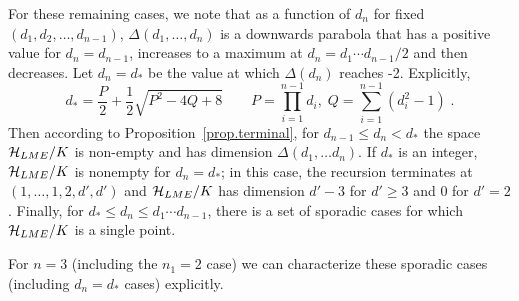 \documentclass[12pt]{article}
\theoremstyle{definition}
\begin{document}
For these remaining cases, we note that as a function of $d_n$ for fixed $(d_1,d_2,\dots,d_{n-1})$,  $\Delta(d_1,\dots,d_n)$ is a downwards parabola that has a positive value for $d_n = d_{n-1}$, increases to a maximum at $d_n = d_1 \cdots d_{n-1}/2$ and then decreases. Let $d_n = d_*$ be the value at which $\Delta(d_n)$ reaches -2. Explicitly,
\[
d_* = \frac{P}{2} + \frac{1}{2}\sqrt{P^2 - 4 Q + 8} \qquad  P = \prod_{i=1}^{n-1} d_i,\;  Q = \sum_{i=1}^{n-1} (d_i^2 - 1) \; .
\]
Then according to Proposition~\ref{prop.terminal}, for $d_{n-1} \le d_n < d_*$ the space ${\cal H}_{LME}/K$ is non-empty and has dimension $\Delta(d_1, \dots d_n)$.  If $d_*$ is an integer, ${\cal H}_{LME}/K$ is nonempty for $d_n= d_*$; in this case, the recursion terminates at $(1,\dots,1,2,d',d')$ and ${\cal H}_{LME}/K$ has dimension $d'-3$ for $d' \ge 3$ and $0$ for $d' = 2$. Finally, for $d_* \le d_n \le d_1 \cdots d_{n-1}$, there is a set of sporadic cases for which ${\cal H}_{LME}/K$ is a single point.

For $n=3$ (including the $n_1=2$ case) we can characterize these sporadic cases (including $d_n = d_*$ cases) explicitly.
\end{document}
